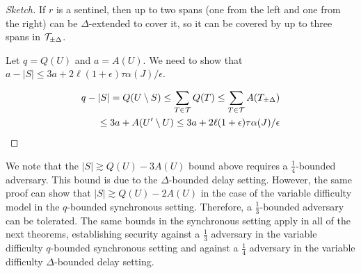 \begin{proof}[Sketch]


  If $r$ is a sentinel, then up to two spans (one from the left and one from the
  right) can be $\Delta$-extended to cover it, so it can be covered by up to
  three spans in $\mathcal{T}_{\pm\Delta}$.

  Let $q = Q(U)$ and $a = A(U)$.
  We need to show that
  $a - |S| \leq 3a + 2\ell (1 + \epsilon) \tau \alpha(J) / \epsilon$.

  \begin{align*}
  q - |S| = Q(U \setminus S) \leq \sum_{T \in \mathcal{T}} Q(T)
  \leq \sum_{T\in\mathcal{T}} A(T_{\pm\Delta})\\
  \leq 3a + A(U' \setminus U) \leq 3a + 2\ell(1 + \epsilon) \tau \alpha(J) / \epsilon
  \end{align*}
\end{proof}

\begin{remark}
  We note that the $|S| \gtrsim Q(U) - 3A(U)$ bound above requires a
  $\frac{1}{4}$-bounded adversary. This bound is due to the $\Delta$-bounded
  delay setting. However, the same proof can show that
  $|S| \gtrsim Q(U) - 2A(U)$ in the case of the variable difficulty model in
  the $q$-bounded synchronous setting. Therefore, a $\frac{1}{3}$-bounded
  adversary can be tolerated. The same bounds in the synchronous setting apply
  in all of the next theorems, establishing security against a $\frac{1}{3}$
  adversary in the variable difficulty $q$-bounded synchronous setting
  and against a $\frac{1}{4}$ adversary in the variable difficulty
  $\Delta$-bounded delay setting.
\end{remark}

